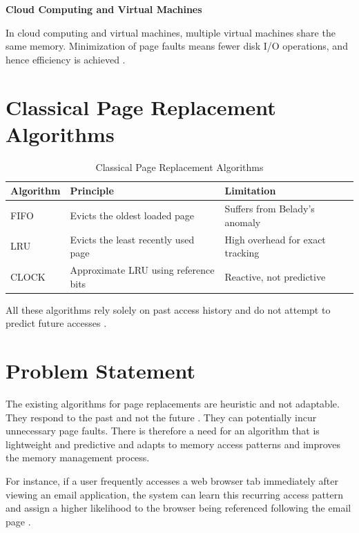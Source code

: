 \documentclass[conference]{IEEEtran}
\begin{document}
\textbf{Cloud Computing and Virtual Machines}

In cloud computing and virtual machines, multiple virtual machines share the same memory. Minimization of page faults means fewer disk I/O operations, and hence efficiency is achieved \cite{megiddo2003arc,corbet2019memory}.
\vspace{0.7\baselineskip}


\section{\textbf{Classical Page Replacement Algorithms}}

\begin{table}[h]
\centering
\caption{Classical Page Replacement Algorithms}
\begin{tabular}{@{}p{1.6cm}p{3.4cm}p{2.4cm}@{}}
\toprule
Algorithm & Principle & Limitation \\ \midrule
FIFO  & Evicts the oldest loaded page & Suffers from Belady's anomaly \\
LRU   & Evicts the least recently used page & High overhead for exact tracking \\
CLOCK & Approximate LRU using reference bits & Reactive, not predictive \\ \bottomrule
\end{tabular}
\end{table}
\vspace{0.7\baselineskip}


All these algorithms rely solely on past access history and do not attempt to predict future accesses \cite{silberschatz2018operating,megiddo2003arc,levinthal1992performance}.

\section{\textbf{Problem Statement}}

The existing algorithms for page replacements are heuristic and not adaptable. They respond to the past and not the future \cite{lee2017machine,jain2016online}. They can potentially incur unnecessary page faults. There is therefore a need for an algorithm that is lightweight and predictive and adapts to memory access patterns and improves the memory management process.

For instance, if a user frequently accesses a web browser tab immediately after viewing an email application, the system can learn this recurring access pattern and assign a higher likelihood to the browser being referenced following the email page \cite{lee2017machine,jain2016online}.
\end{document}
